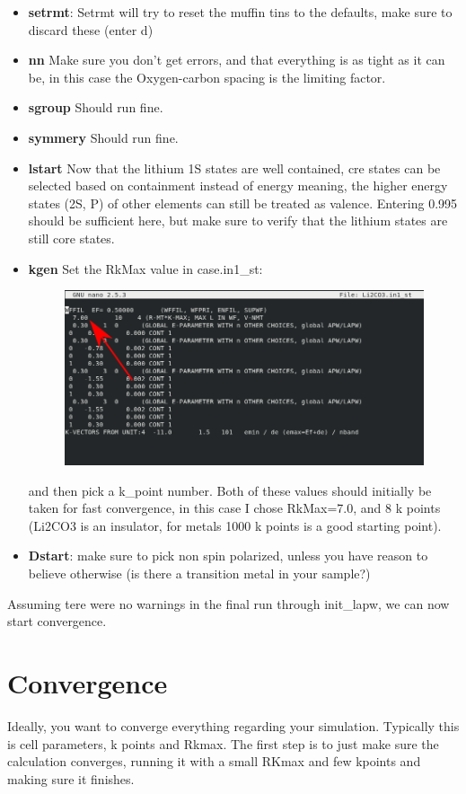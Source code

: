 \documentclass[12pt]{article}
\begin{document}
\begin{itemize}
	\item \textbf{setrmt}: Setrmt will try to reset the muffin tins to the defaults, make sure to discard these (enter d)
	\item \textbf{nn} Make sure you don't get errors, and that everything is as tight as it can be, in this case the Oxygen-carbon spacing is the limiting factor.  
	\item \textbf{sgroup} Should run fine.
	\item  \textbf{symmery} Should run fine. 
	\item \textbf{lstart} Now that the lithium 1S states are well contained, cre states can be selected based on containment instead of energy meaning, the higher energy states (2S, P) of other elements can still be treated as valence.  Entering 0.995 should be sufficient here, but make sure to verify that the lithium states are still core states.
	\item \textbf{kgen} Set the RkMax value in case.in1\_st:		
	\begin{figure}[H]
		\includegraphics[scale=0.4]{./images/init_lapw3.png}
	\end{figure}
	and then pick a k\_point number.  Both of these values should initially be taken for fast convergence, in this case I chose RkMax=7.0, and 8 k points (Li2CO3 is an insulator, for metals 1000 k points is a good starting point).
	\item \textbf{Dstart}: make sure to pick non spin polarized, unless you have reason to believe otherwise (is there a transition metal in your sample?)
\end{itemize}

Assuming tere were no warnings in the final run through init\_lapw, we can now start convergence.

\section{Convergence}
Ideally, you want to converge everything regarding your simulation.  Typically this is cell parameters, k points and Rkmax.  The first step is to just make sure the calculation converges, running it with a small RKmax and few kpoints and making sure it finishes.  
\end{document}
